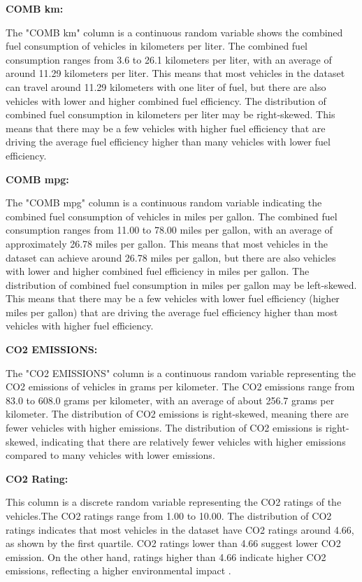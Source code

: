 \documentclass[12pt, a4paper,oneside]{book}
\numberwithin{equation}{section}
\begin{document}
\hfill \break
\textbf{COMB km:}

The "COMB km" column is a continuous random variable shows the combined fuel consumption of vehicles in kilometers per liter. The combined fuel consumption ranges from 3.6 to 26.1 kilometers per liter, with an average of around 11.29 kilometers per liter. This means that most vehicles in the dataset can travel around 11.29 kilometers with one liter of fuel, but there are also vehicles with lower and higher combined fuel efficiency.
The distribution of combined fuel consumption in kilometers per liter may be right-skewed. This means that there may be a few vehicles with higher fuel efficiency that are driving the average fuel efficiency higher than many vehicles with lower fuel efficiency.

\hfill \break
\textbf{COMB mpg:}

The "COMB mpg" column is a continuous random variable indicating the combined fuel consumption of vehicles in miles per gallon. The combined fuel consumption ranges from 11.00 to 78.00 miles per gallon, with an average of approximately 26.78 miles per gallon. This means that most vehicles in the dataset can achieve around 26.78 miles per gallon, but there are also vehicles with lower and higher combined fuel efficiency in miles per gallon.
The distribution of combined fuel consumption in miles per gallon may be left-skewed. This means that there may be a few vehicles with lower fuel efficiency (higher miles per gallon) that are driving the average fuel efficiency higher than most vehicles with higher fuel efficiency.

\hfill \break
\textbf{CO2 EMISSIONS:}

The "CO2 EMISSIONS" column is a continuous random variable representing the CO2 emissions of vehicles in grams per kilometer. The CO2 emissions range from 83.0 to 608.0 grams per kilometer, with an average of about 256.7 grams per kilometer. The distribution of CO2 emissions is right-skewed, meaning there are fewer vehicles with higher emissions.
The distribution of CO2 emissions is right-skewed, indicating that there are relatively fewer vehicles with higher emissions compared to many vehicles with lower emissions.

\hfill \break
\textbf{CO2 Rating:}

This column is a discrete random variable representing the CO2 ratings of the vehicles.The CO2 ratings range from 1.00 to 10.00.
The distribution of CO2 ratings indicates that most vehicles in the dataset have CO2 ratings around 4.66, as shown by the first quartile. CO2 ratings lower than 4.66 suggest lower CO2 emission. On the other hand, ratings higher than 4.66 indicate higher CO2 emissions, reflecting a higher environmental impact .
\end{document}
